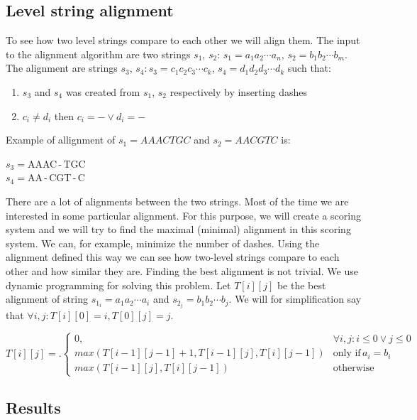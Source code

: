 \subsection{Level string alignment}
\label{section:alignment}

To see how two level strings compare to each other we will align them. The input
to the alignment algorithm are two strings $s_1$, $s_2$:
$s_1=a_1a_2\cdots a_n$, $s_2=b_1b_2\cdots b_m$. The alignment are strings
$s_3$, $s_4: s_3 = c_1c_2c_3\cdots c_k$, $s_4 = d_1d_2d_3\cdots d_k$ such that:

\begin{enumerate}
\item $s_3$ and $s_4$ was created from $s_1$, $s_2$ respectively by inserting dashes
\item $c_i \neq d_i$ then $c_i = - \lor d_i = -$
\end{enumerate}

Example of allignment of $s_1 = AAACTGC$ and $s_2 = AACGTC$ is:

\begin{center}
$s_3 = $AAAC\,-\,TGC\\
$s_4 = $AA\,-\,CGT\,-\,C
\end{center}

There are a lot of alignments between the two strings. Most of the time we
are interested in some particular alignment. For this purpose, we will create a
scoring system and we will try to find the maximal (minimal) alignment in this scoring
system. We can, for example, minimize the number of dashes. Using the alignment
defined this way we can see how two-level strings compare to each other and how similar they are.
Finding the best alignment is not trivial. We use dynamic programming for
solving this problem. Let $T[i][j]$ be the best alignment of string $s_{1_i} = a_1a_2\cdots a_i$
and $s_{2_j} = b_1b_2\cdots b_j$. We will for simplification say that $\forall i, j: T[i][0] = i, T[0][j] = j$.

\[
T[i][j] = \bigl.
  \begin{cases}
    0, & \forall i,j : i\leq 0 \lor j\leq 0 \\
    max(T[i-1][j-1] + 1, T[i-1][j], T[i][j-1]) & \text{only if} \, a_i = b_i \\ 
    max(T[i-1][j], T[i][j-1]) & \text{otherwise}
  \end{cases}
\]

\subsection{Results}

